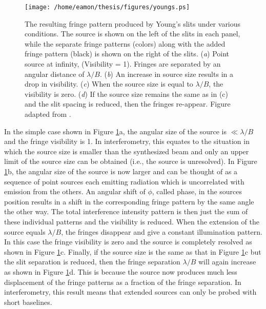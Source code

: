 \begin{figure}[hbt!]
\centering 
          \texttt{[image: /home/eamon/thesis/figures/youngs.ps]}
\caption[Fringe pattern produced by Young's slits under various situations.]{The resulting fringe pattern produced by Young's slits under various conditions. The source is shown on the left of the slits in each panel, while the separate fringe patterns (colors) along with the added fringe pattern (black) is shown on the right of the slits. (\textit{a}) Point source at infinity, (Visibility = 1). Fringes are separated by an angular distance of $\lambda /B$. (\textit{b}) An increase in source size results in a drop in visibility. (\textit{c}) When the source size is equal to $\lambda /B$, the visibility is zero. (\textit{d}) If the source size remains the same as in (c) and the slit spacing is reduced, then the fringes re-appear. Figure adapted from \cite{jackson_2008}.}
\label{fig2.4}
\end{figure}

In the simple case shown in Figure \ref{fig2.4}a, the angular size of the source is  $\ll \lambda/B$ and the fringe visibility is 1. In interferometry, this equates to the situation in which the source size is smaller than the synthesized beam and only an upper limit of the source size can be obtained (i.e., the source is unresolved). In Figure \ref{fig2.4}b, the angular size of the source is now larger and can be thought of as a sequence of point sources each emitting radiation which is uncorrelated with emission from the others. An angular shift of $\phi$, called phase, in the sources position results in a shift in the corresponding fringe pattern by the same angle the other way. The total interference intensity pattern is then just the sum of these individual patterns and the visibility is reduced. When the extension of the source equals $\lambda/B$, the fringes disappear and give a constant illumination pattern. In this case the fringe visibility is zero and the source is completely resolved as shown in Figure \ref{fig2.4}c. Finally, if the source size is the same as that in Figure \ref{fig2.4}c but the slit separation is reduced, then the fringe separation $\lambda/B$ will again increase as shown in Figure \ref{fig2.4}d. This is because the source now produces much less displacement of the fringe patterns as a fraction of the fringe separation. In interferometry, this result means that extended sources can only be probed with short baselines. 

